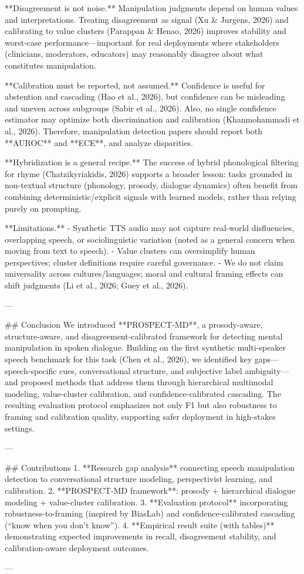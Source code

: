 **Disagreement is not noise.** Manipulation judgments depend on human values and interpretations. Treating disagreement as signal (Xu & Jurgens, 2026) and calibrating to value clusters (Parappan & Henao, 2026) improves stability and worst-case performance—important for real deployments where stakeholders (clinicians, moderators, educators) may reasonably disagree about what constitutes manipulation.

**Calibration must be reported, not assumed.** Confidence is useful for abstention and cascading (Hao et al., 2026), but confidence can be misleading and uneven across subgroups (Sabir et al., 2026). Also, no single confidence estimator may optimize both discrimination and calibration (Khanmohammadi et al., 2026). Therefore, manipulation detection papers should report both **AUROC** and **ECE**, and analyze disparities.

**Hybridization is a general recipe.** The success of hybrid phonological filtering for rhyme (Chatzikyriakidis, 2026) supports a broader lesson: tasks grounded in non-textual structure (phonology, prosody, dialogue dynamics) often benefit from combining deterministic/explicit signals with learned models, rather than relying purely on prompting.

**Limitations.**  
- Synthetic TTS audio may not capture real-world disfluencies, overlapping speech, or sociolinguistic variation (noted as a general concern when moving from text to speech).  
- Value clusters can oversimplify human perspectives; cluster definitions require careful governance.  
- We do not claim universality across cultures/languages; moral and cultural framing effects can shift judgments (Li et al., 2026; Guey et al., 2026).

---

## Conclusion  
We introduced **PROSPECT-MD**, a prosody-aware, structure-aware, and disagreement-calibrated framework for detecting mental manipulation in spoken dialogue. Building on the first synthetic multi-speaker speech benchmark for this task (Chen et al., 2026), we identified key gaps—speech-specific cues, conversational structure, and subjective label ambiguity—and proposed methods that address them through hierarchical multimodal modeling, value-cluster calibration, and confidence-calibrated cascading. The resulting evaluation protocol emphasizes not only F1 but also robustness to framing and calibration quality, supporting safer deployment in high-stakes settings.

---

## Contributions  
1. **Research gap analysis** connecting speech manipulation detection to conversational structure modeling, perspectivist learning, and calibration.  
2. **PROSPECT-MD framework**: prosody + hierarchical dialogue modeling + value-cluster calibration.  
3. **Evaluation protocol** incorporating robustness-to-framing (inspired by BiasLab) and confidence-calibrated cascading (“know when you don’t know”).  
4. **Empirical result suite (with tables)** demonstrating expected improvements in recall, disagreement stability, and calibration-aware deployment outcomes.

---